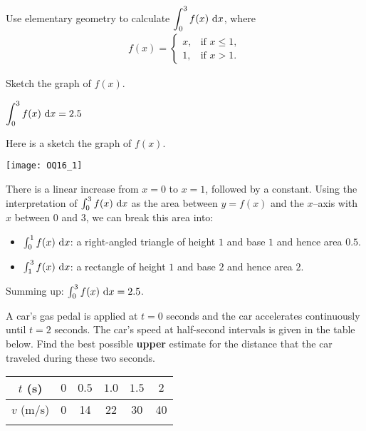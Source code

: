 \begin{Mquestion}[2016Q1]\label{1.1defintgeomb}
Use elementary geometry to calculate $\displaystyle \int_0^3 f(x)\,\,\mathrm{d}x$, where
\begin{align*}
  f(x) = \begin{cases}
  x, & \text{if } x \le 1,\\
  1, & \text{if } x > 1.
  \end{cases}
\end{align*}

\end{Mquestion}

\begin{hint}
Sketch the graph of $f(x)$.
\end{hint}

\begin{answer}
$\displaystyle\int_0^3 f(x)\,\,\mathrm{d}x = 2.5$
\end{answer}

\begin{solution}
Here is a sketch the graph of $f(x)$.

\begin{center}
    \texttt{[image: OQ16\_1]}
\end{center}

\noindent
There is a linear increase from $x=0$ to $x=1$, followed by a constant. Using the interpretation of $\int_0^3 f(x)\,\,\mathrm{d}x$ as the area between $y=f(x)$ and the
$x$--axis with $x$ between $0$ and $3$, we can break this area into:
\begin{itemize}
  \item $\int_0^1 f(x)\,\,\mathrm{d}x$: a right-angled triangle of height $1$ and base $1$ and hence area $0.5$.
  \item $\int_1^3 f(x)\,\,\mathrm{d}x$: a rectangle of height $1$ and base $2$ and hence
area $2$.
\end{itemize}
Summing up: $\int_0^3 f(x)\,\,\mathrm{d}x = 2.5$.
\end{solution}




\begin{Mquestion}[2016Q1]\label{1.1cartime}
A car's gas pedal is applied at $t=0$ seconds and the car
accelerates continuously until $t=2$ seconds.
The car's speed at half-second intervals is given in the table
below.
Find the best possible \textbf{upper} estimate for the distance
that the car traveled during these two seconds.
\begin{center}
\renewcommand{\arraystretch}{1.3}
   \begin{tabular}{!{\vrule width 1pt}c!{\vrule width 1pt}c|c|c|c|c!{\vrule width 1pt}}
        $t$ (s)  & $0$ & $0.5$ & $1.0$ & $1.5$ & $2$ \\    \hline
        $v$ (m/s) & 0 & 14 & 22 & 30 & 40 \\
     \end{tabular}
\renewcommand{\arraystretch}{1.0}
\end{center}
\end{Mquestion}

